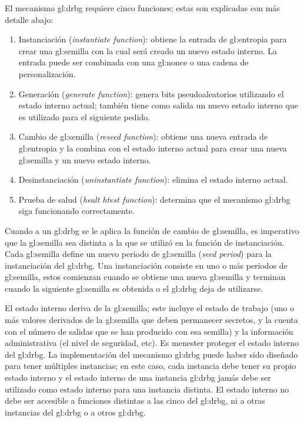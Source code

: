 El mecanismo \gls{gl:drbg} requiere cinco funciones; estas son explicadas con
más detalle abajo:
\begin{enumerate}
  \item Instanciación (\textit{instantiate function}): obtiene la entrada de
    \gls{gl:entropia} para crear una \gls{gl:semilla} con la cual será
    creado un nuevo estado interno. La entrada puede ser combinada con
    una \gls{gl:nonce} o una cadena de personalización.
  \item Generación (\textit{generate function}): genera bits pseudoaleatorios
    utilizando el estado interno actual; también tiene como salida un nuevo
    estado interno que es utilizado para el siguiente pedido.
  \item Cambio de \gls{gl:semilla} (\textit{reseed function}): obtiene una
    nueva entrada de \gls{gl:entropia} y la combina con el estado interno
    actual para crear una nueva \gls{gl:semilla} y un nuevo estado interno.
  \item Desinstanciación (\textit{uninstantiate function}): elimina el estado
    interno actual.
  \item Prueba de salud (\textit{healt htest function}): determina que el
    mecanismo \gls{gl:drbg} siga funcionando correctamente.
\end{enumerate}

Cuando a un \gls{gl:drbg} se le aplica la función de cambio de \gls{gl:semilla},
es imperativo que la \gls{gl:semilla} sea distinta a la que se utilizó en la
función de instanciación. Cada \gls{gl:semilla} define un nuevo
periodo de \gls{gl:semilla} (\textit{seed period}) para la instanciación del
\gls{gl:drbg}. Una instanciación consiste en uno o más periodos de
\gls{gl:semilla}, estos comienzan cuando se obtiene una nueva \gls{gl:semilla} y
terminan cuando la siguiente \gls{gl:semilla} es obtenida o el \gls{gl:drbg}
deja de utilizarse.

El estado interno deriva de la \gls{gl:semilla}; este incluye el estado de
trabajo (uno o más valores derivados de la \gls{gl:semilla} que deben
permanecer secretos, y la cuenta con el número de salidas que se han producido
con esa semilla) y la información administrativa (el nivel de seguridad, etc).
Es menester proteger el estado interno del \gls{gl:drbg}. La implementación del
mecanismo \gls{gl:drbg} puede haber sido diseñado para tener múltiples
instancias; en este caso, cada instancia debe tener su propio estado interno y
el estado interno de una instancia \gls{gl:drbg} jamás debe ser utilizado como
estado interno para una instancia distinta. El estado interno no debe ser
accesible a funciones distintas a las cinco del \gls{gl:drbg}, ni a otras
instancias del \gls{gl:drbg} o a otros \gls{gl:drbg}.

